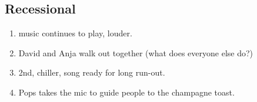 \hypertarget{recessional}{%
\subsection{Recessional}\label{recessional}}

\begin{enumerate}
\def\labelenumi{\arabic{enumi}.}
\tightlist
\item
  music continues to play, louder.
\item
  David and Anja walk out together (what does everyone else do?)
\item
  2nd, chiller, song ready for long run-out.
\item
  Pops takes the mic to guide people to the champagne toast.
\end{enumerate}
